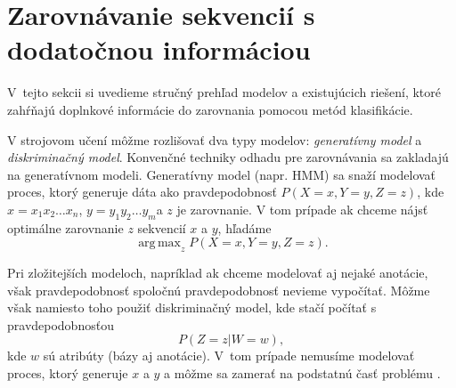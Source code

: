\section[Zarov. s dodat. info.]{Zarovnávanie sekvencií s dodatočnou informáciou}
\label{section:other-work}

V~tejto sekcii si uvedieme stručný prehľad modelov a existujúcich riešení, ktoré zahŕňajú doplnkové informácie do zarovnania pomocou metód klasifikácie.

V strojovom učení môžme rozlišovať dva typy modelov: \textit{generatívny model} a \textit{diskriminačný model}.
Konvenčné techniky odhadu pre zarovnávania sa zakladajú na generatívnom modeli. Generatívny model (napr. HMM) sa snaží modelovať proces, ktorý generuje dáta ako pravdepodobnosť $P(X=x,Y=y,Z=z)$, kde $x = x_1x_2\dots x_n$, $y = y_1y_2\dots y_m$a $z$ je zarovnanie. V tom prípade ak chceme nájsť optimálne zarovnanie $z$ sekvencií $x$ a $y$, hľadáme
$$\operatorname{ arg\,max}_z P(X = x,Y = y,Z = z).$$

Pri zložitejších modeloch, napríklad ak chceme modelovať aj nejaké anotácie, však pravdepodobnosť spoločnú pravdepodobnosť nevieme vypočítať.
Môžme však namiesto toho použiť diskriminačný model, kde stačí počítať s pravdepodobnosťou
$$P(Z=z|W=w),$$ kde $w$ sú atribúty (bázy aj anotácie). V~tom prípade nemusíme modelovať proces, ktorý generuje $x$ a $y$ a môžme sa zamerať na podstatnú časť problému \cite{svmTrainingProteinsAlignment}.



